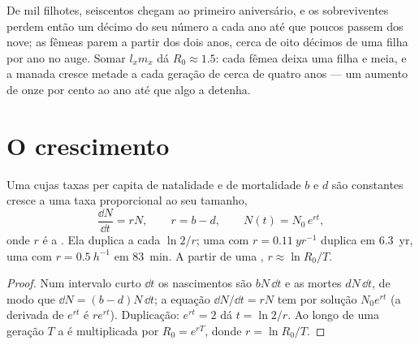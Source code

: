 \begin{example}\label{ex:b1:populations:deer}
De mil filhotes, seiscentos chegam ao primeiro aniversário, e os
sobreviventes perdem então um décimo do seu número a cada ano até que
poucos passem dos nove; as fêmeas parem a partir dos dois anos, cerca
de oito décimos de uma filha por ano no auge. Somar $l_x m_x$ dá
$R_0 \approx 1.5$: cada fêmea deixa uma filha e meia, e a manada cresce
metade a cada geração de cerca de quatro anos --- um aumento de onze
por cento ao ano até que algo a detenha.
\end{example}

\section{O crescimento}

\begin{theorem}\label{thm:b1:populations:exponential}
Uma  cujas taxas per capita de natalidade e de mortalidade
$b$ e $d$ são constantes cresce a uma taxa proporcional ao seu tamanho,
\[
\frac{\dd N}{\dd t} = rN, \qquad r = b - d, \qquad N(t) = N_0\,e^{rt},
\]
onde $r$ é a \emph{}. Ela duplica a cada
$\ln 2/r$; uma  com $r = \qty{0.11}{yr^{-1}}$ duplica em
\qty{6.3}{yr}, uma com $r = \qty{0.5}{h^{-1}}$ em \qty{83}{min}. A
partir de uma , $r \approx \ln R_0 / T$.
\end{theorem}
\begin{proof}
Num intervalo curto $\dd t$ os nascimentos são $bN\,\dd t$ e as mortes
$dN\,\dd t$, de modo que $\dd N = (b - d)N\,\dd t$; a equação
$\dd N/\dd t = rN$ tem por solução $N_0 e^{rt}$ (a derivada de
$e^{rt}$ é $re^{rt}$). Duplicação: $e^{rt} = 2$ dá $t = \ln 2/r$. Ao
longo de uma geração $T$ a  é multiplicada por
$R_0 = e^{rT}$, donde $r = \ln R_0/T$.
\end{proof}

